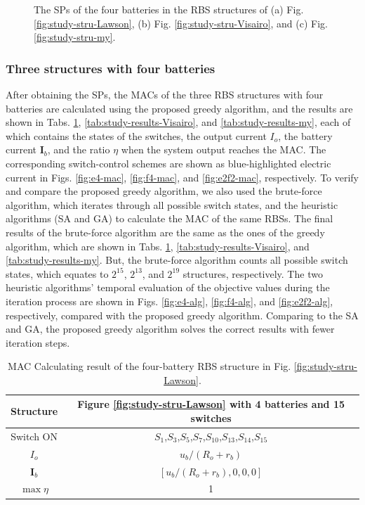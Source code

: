 \documentclass{article}
\begin{document}
\begin{figure}[htbp]
\begin{subfigure}[b]{0.31\textwidth}
        \caption{}
        \label{fig:e2f2-sp}
    \end{subfigure}
    \caption{The SPs of the four batteries in the RBS structures of (a) Fig. \ref{fig:study-stru-Lawson}, (b) Fig. \ref{fig:study-stru-Visairo}, and (c) Fig. \ref{fig:study-stru-my}.}
\end{figure}

\subsubsection{Three structures with four batteries}

After obtaining the SPs, the MACs of the three RBS structures with four batteries are calculated using the proposed greedy algorithm, and the results are shown in Tabs. \ref{tab:study-results-Lawson}, \ref{tab:study-results-Visairo}, and \ref{tab:study-results-my}, each of which contains the states of the switches, the output current $I_o$, the battery current $\bm{I}_b$, and the ratio $\eta$ when the system output reaches the MAC.
The corresponding switch-control schemes are shown as blue-highlighted electric current in Figs. \ref{fig:e4-mac}, \ref{fig:f4-mac}, and \ref{fig:e2f2-mac}, respectively.
To verify and compare the proposed greedy algorithm, we also used the brute-force algorithm, which iterates through all possible switch states, and the heuristic algorithms (SA and GA) to calculate the MAC of the same RBSs. 
The final results of the brute-force algorithm are the same as the ones of the greedy algorithm, which are shown in Tabs. \ref{tab:study-results-Lawson}, \ref{tab:study-results-Visairo}, and \ref{tab:study-results-my}.
But, the brute-force algorithm counts all possible switch states, which equates to $2^{15}$, $2^{13}$, and $2^{19}$ structures, respectively.
The two heuristic algorithms' temporal evaluation of the objective values during the iteration process are shown in Figs. \ref{fig:e4-alg}, \ref{fig:f4-alg}, and \ref{fig:e2f2-alg}, respectively, compared with the proposed greedy algorithm. 
Comparing to the SA and GA, the proposed greedy algorithm solves the correct results with fewer iteration steps. 

\begin{table}[htbp]
  \centering
    \caption{MAC Calculating result of the four-battery RBS structure in Fig. \ref{fig:study-stru-Lawson}.}
    \begin{tabular}{cc}
    \toprule
        Structure & Figure \ref{fig:study-stru-Lawson} with 4 batteries and 15 switches  \\
    \midrule
    Switch ON & $S_1$,$S_3$,$S_5$,$S_7$,$S_{10}$,$S_{13}$,$S_{14}$,$S_{15}$ \\
    $I_o$ & $u_b/(R_o+r_b)$ \\
    $\bm{I}_b$ & $[u_b/(R_o+r_b),0,0,0]$ \\
    $\max \eta$     & 1 \\
    \bottomrule
    \end{tabular}
  \label{tab:study-results-Lawson}
\end{table}
\end{document}
